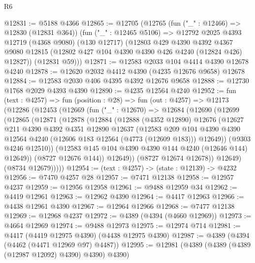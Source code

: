 \begin{lexlean}{R6}
\begin{coremodule}
@12831 := @5188 @4366
@12865 := @12705
    (@12765
      (fun ("_" : @12466) => @12830 (@12831 @364))
      (fun ("_" : @12465 @5106) =>
      @12792
        @2025
        @4393
        @12719
        (@4368 @9080)
        (@130 @12717)
        (@12803
          @429
          @4390
          @4392
          @4367
          @9080
          @12815
          (@12802 @427 @104 @4390 @4390 @426 @4240 (@12824 @426) @12827))
        (@12831 @59)))
@12871 := @12583 @2033 @104 @4414 @4390 @12678 @4240
@12878 := @12620 @2032 @4412 @4390 (@4235 @12676 @9658) @12678
@12884 := @12583 @2030 @406 @4395 @4392 @12676 @9658
@12888 := @12730 @1768 @2029 @4393 @4390
@12890 := @4235 @12564 @4240
@12952 := fun (text : @4257) =>
  fun (position : @28) =>
  fun (out : @4257) =>
  @12173
    (@12286
      (@12453
        (@12669
          (fun ("_" : @12670) =>
          @12684
            (@12690
              (@12699
                (@12865
                  (@12871
                    (@12878
                      (@12884
                        (@12888
                          (@4352 @12890)
                          @12676
                          (@12627
                            @211
                            @4390
                            @4392
                            @4351
                            @12890
                            @12637
                            (@12583
                              @209
                              @104
                              @4390
                              @4390
                              @12564
                              @4240
                              (@12606 @183 @12564 (@4773 (@12609 @183)))
                              @12649))
                          (@9303 @4246 @12510))
                        (@12583 @145 @104 @4390 @4390 @144 @4240 (@12646 @144) @12649))
                      (@8727 @12676 @144))
                    @12649))
                (@8727 @12674 @12678))
              @12649)
            (@8734 @12679)))))
@12954 := (text : @4257) -> (state : @12139) -> @4232
@12956 := @7470 @4257 @28
@12957 := @7471 @12138
@12958 := @12957 @4237
@12959 := @12956 @12958
@12961 := @9488 @12959 @34
@12962 := @4419 @12961
@12963 := @12962 @4390
@12964 := @4417 @12963
@12966 := @4438 @12961 @4390
@12967 := @12964 @12966
@12968 := @7477 @12138
@12969 := @12968 @4237
@12972 := @4389 (@4394 (@4660 @12969))
@12973 := @4664 @12969
@12974 := @9488 @12973
@12975 := @12974 @714
@12981 := @4417 (@4419 @12975 @4390) (@4438 @12975 @4390)
@12987 := @4389 (@4394 (@4462 (@4471 @12969 @97) @4487))
@12995 := @12981 (@4389 (@4389 (@4389 (@12987 @12092) @4390) @4390) @4390)

\end{coremodule}
\end{lexlean}
